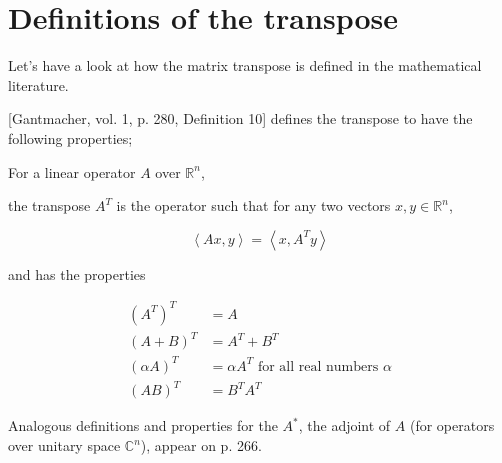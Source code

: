 \section{Definitions of the transpose}

Let's have a look at how the matrix transpose is defined in the mathematical literature.

[Gantmacher, vol. 1, p. 280, Definition 10] defines the transpose to have the following properties;

For a linear operator $A$ over $\mathbb R^n$,

the transpose $A^T$ is the operator such that for any two vectors $x, y \in \mathbb R^n$,

\[
\left\langle Ax, y \right\rangle = \left\langle x, A^T y \right\rangle
\]

and has the properties

\begin{align}

(A^T)^T & = A \\
(A + B)^T & = A^T + B^T \\
(\alpha A)^T & = \alpha A^T \text{ for all real numbers } \alpha \\
(A B)^T & = B^T A^T

\end{align}

Analogous definitions and properties for the $A^*$, the adjoint of $A$ (for operators over unitary space $\mathbb C^n$), appear on p. 266.